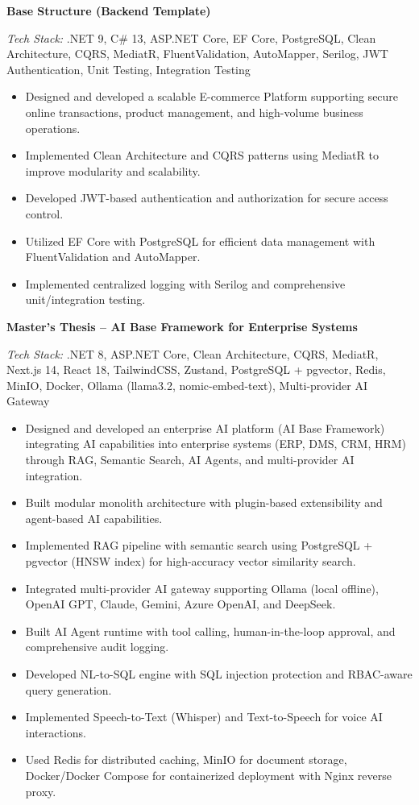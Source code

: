 \documentclass[a4paper,10pt]{article}
\newcommand{\projectentry}[2]{%
    \noindent
    \textbf{\color{darktext}#1}
    \vspace{-0.3em}
    #2
    \vspace{0.5em}
}
\newcommand{\techstack}[1]{%
    \vspace{-0.3em}
    \noindent\textcolor{lighttext}{\small\textit{Tech Stack:} #1}
    \vspace{0.2em}
}
\begin{document}
\projectentry{Base Structure (Backend Template)}{
    \techstack{.NET 9, C\# 13, ASP.NET Core, EF Core, PostgreSQL, Clean Architecture, CQRS, MediatR, FluentValidation, AutoMapper, Serilog, JWT Authentication, Unit Testing, Integration Testing}

    \begin{itemize}[leftmargin=1.2em, itemsep=0.1em, topsep=0.2em]
        \item Designed and developed a scalable E-commerce Platform supporting secure online transactions, product management, and high-volume business operations.
        \item Implemented Clean Architecture and CQRS patterns using MediatR to improve modularity and scalability.
        \item Developed JWT-based authentication and authorization for secure access control.
        \item Utilized EF Core with PostgreSQL for efficient data management with FluentValidation and AutoMapper.
        \item Implemented centralized logging with Serilog and comprehensive unit/integration testing.
    \end{itemize}
}

\projectentry{Master's Thesis -- AI Base Framework for Enterprise Systems}{
    \techstack{.NET 8, ASP.NET Core, Clean Architecture, CQRS, MediatR, Next.js 14, React 18, TailwindCSS, Zustand, PostgreSQL + pgvector, Redis, MinIO, Docker, Ollama (llama3.2, nomic-embed-text), Multi-provider AI Gateway}

    \begin{itemize}[leftmargin=1.2em, itemsep=0.1em, topsep=0.2em]
        \item Designed and developed an enterprise AI platform (AI Base Framework) integrating AI capabilities into enterprise systems (ERP, DMS, CRM, HRM) through RAG, Semantic Search, AI Agents, and multi-provider AI integration.
        \item Built modular monolith architecture with plugin-based extensibility and agent-based AI capabilities.
        \item Implemented RAG pipeline with semantic search using PostgreSQL + pgvector (HNSW index) for high-accuracy vector similarity search.
        \item Integrated multi-provider AI gateway supporting Ollama (local offline), OpenAI GPT, Claude, Gemini, Azure OpenAI, and DeepSeek.
        \item Built AI Agent runtime with tool calling, human-in-the-loop approval, and comprehensive audit logging.
        \item Developed NL-to-SQL engine with SQL injection protection and RBAC-aware query generation.
        \item Implemented Speech-to-Text (Whisper) and Text-to-Speech for voice AI interactions.
        \item Used Redis for distributed caching, MinIO for document storage, Docker/Docker Compose for containerized deployment with Nginx reverse proxy.
    \end{itemize}
}
\end{document}
